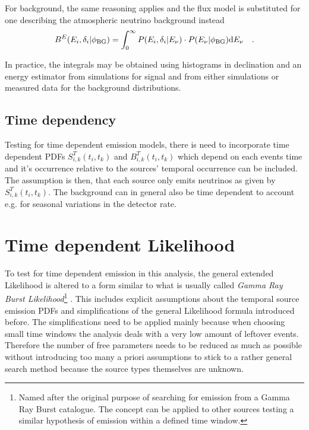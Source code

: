 For background, the same reasoning applies and the flux model is substituted for one describing the atmospheric neutrino background instead
\begin{equation}
  B^E(E_i, \delta_i|\phi_\mathrm{BG}) =
    \int_0^\infty P(E_i,\delta_i|E_\nu)\cdot P(E_\nu|\phi_\mathrm{BG}) \mathrm{d}E_\nu
    \quad\text{.}
\end{equation}

In practice, the integrals may be obtained using histograms in declination and an energy estimator from simulations for signal and from either simulations or measured data for the background distributions.

\subsection{Time dependency}
Testing for time dependent emission models, there is need to incorporate time dependent PDFs $S_{i,k}^T(t_i, t_k)$ and $B_{i,k}^T(t_i, t_k)$ which depend on each events time and it's occurrence relative to the sources' temporal occurrence can be included.
The assumption is then, that each source only emits neutrinos as given by $S_{i,k}^T(t_i, t_k)$.
The background can in general also be time dependent to account e.g. for seasonal variations in the detector rate.


\section{Time dependent Likelihood}
To test for time dependent emission in this analysis, the general extended Likelihood is altered to a form similar to what is usually called \emph{Gamma Ray Burst Likelihood}\footnote{Named after the original purpose of searching for emission from a Gamma Ray Burst catalogue. The concept can be applied to other sources testing a similar hypothesis of emission within a defined time window.} .
This includes explicit assumptions about the temporal source emission PDFs and simplifications of the general Likelihood formula introduced before.
The simplifications need to be applied mainly because when choosing small time windows the analysis deals with a very low amount of leftover events.
Therefore the number of free parameters needs to be reduced as much as possible without introducing too many a priori assumptions to stick to a rather general search method because the source types themselves are unknown.

